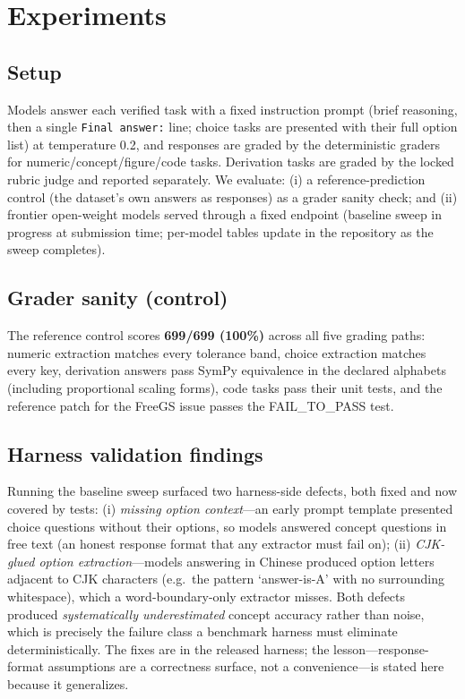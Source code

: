 \section{Experiments}
\label{sec:experiments}

\subsection{Setup}
Models answer each verified task with a fixed instruction prompt (brief reasoning, then a single \texttt{Final answer:} line; choice tasks are presented with their full option list) at temperature 0.2, and responses are graded by the deterministic graders for numeric/concept/figure/code tasks. Derivation tasks are graded by the locked rubric judge and reported separately. We evaluate: (i) a reference-prediction control (the dataset's own answers as responses) as a grader sanity check; and (ii) frontier open-weight models served through a fixed endpoint (baseline sweep in progress at submission time; per-model tables update in the repository as the sweep completes).

\subsection{Grader sanity (control)}
The reference control scores \textbf{699/699 (100\%)} across all five grading paths: numeric extraction matches every tolerance band, choice extraction matches every key, derivation answers pass SymPy equivalence in the declared alphabets (including proportional scaling forms), code tasks pass their unit tests, and the reference patch for the FreeGS issue passes the FAIL\_TO\_PASS test.

\subsection{Harness validation findings}
Running the baseline sweep surfaced two harness-side defects, both fixed and now covered by tests: (i) \emph{missing option context}---an early prompt template presented choice questions without their options, so models answered concept questions in free text (an honest response format that any extractor must fail on); (ii) \emph{CJK-glued option extraction}---models answering in Chinese produced option letters adjacent to CJK characters (e.g.\ the pattern `answer-is-A' with no surrounding whitespace), which a word-boundary-only extractor misses. Both defects produced \emph{systematically underestimated} concept accuracy rather than noise, which is precisely the failure class a benchmark harness must eliminate deterministically. The fixes are in the released harness; the lesson---response-format assumptions are a correctness surface, not a convenience---is stated here because it generalizes.

